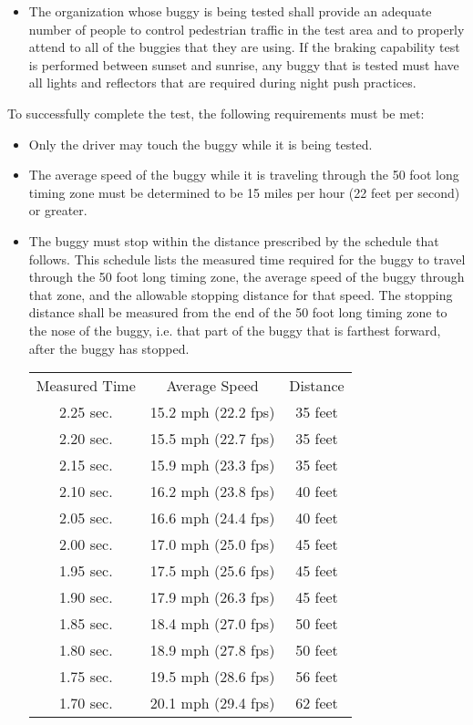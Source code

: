 \begin{itemize}
		\item
		The organization whose buggy is being tested shall provide an adequate number
		of people to control pedestrian traffic in the test area and to properly attend
		to all of the buggies that they are using. If the braking capability test is
		performed between sunset and sunrise, any buggy that is tested must have all
		lights and reflectors that are required during night push practices.

	\end{itemize}

	\noindent To successfully complete the test, the following requirements must be met:

	\begin{itemize}

		\item
		Only the driver may touch the buggy while it is being tested.

		\item
		The average speed of the buggy while it is traveling through the 50 foot long
		timing zone must be determined to be 15 miles per hour (22 feet per second) or
		greater.

		\item
		The buggy must stop within the distance prescribed by the schedule that
		follows. This schedule lists the measured time required for the buggy to travel
		through the 50 foot long timing zone, the average speed of the buggy through
		that zone, and the allowable stopping distance for that speed. The stopping
		distance shall be measured from the end of the 50 foot long timing zone to the
		nose of the buggy, i.e. that part of the buggy that is farthest forward, after
		the buggy has stopped.

			\begin{tabular}{c c c}
				Measured Time & Average Speed & Distance \\
				2.25 sec. & 15.2 mph (22.2 fps) & 35 feet\\
				2.20 sec. & 15.5 mph (22.7 fps) & 35 feet\\
				2.15 sec. & 15.9 mph (23.3 fps) & 35 feet\\
				2.10 sec. & 16.2 mph (23.8 fps) & 40 feet\\
				2.05 sec. & 16.6 mph (24.4 fps) & 40 feet\\
				2.00 sec. & 17.0 mph (25.0 fps) & 45 feet\\
				1.95 sec. & 17.5 mph (25.6 fps) & 45 feet\\
				1.90 sec. & 17.9 mph (26.3 fps) & 45 feet\\
				1.85 sec. & 18.4 mph (27.0 fps) & 50 feet\\
				1.80 sec. & 18.9 mph (27.8 fps) & 50 feet\\
				1.75 sec. & 19.5 mph (28.6 fps) & 56 feet\\
				1.70 sec. & 20.1 mph (29.4 fps) & 62 feet\\
			\end{tabular}


\end{itemize}
